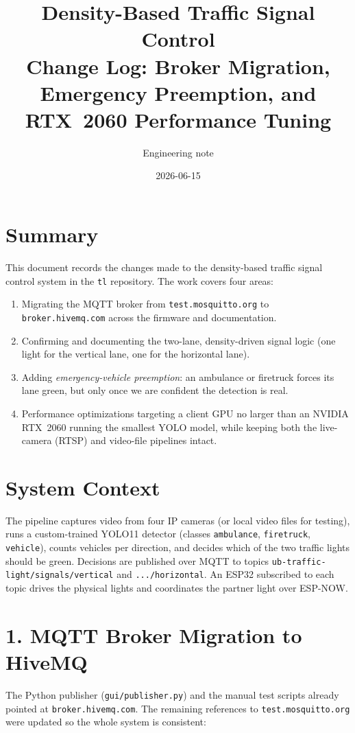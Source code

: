 \documentclass[11pt]{article}
\title{Density-Based Traffic Signal Control \\ \large Change Log: Broker Migration, Emergency Preemption, and RTX~2060 Performance Tuning}
\author{Engineering note}
\date{2026-06-15}
\begin{document}
\maketitle

\section{Summary}
This document records the changes made to the density-based traffic signal
control system in the \texttt{tl} repository. The work covers four areas:

\begin{enumerate}[nosep]
  \item Migrating the MQTT broker from \texttt{test.mosquitto.org} to
        \texttt{broker.hivemq.com} across the firmware and documentation.
  \item Confirming and documenting the two-lane, density-driven signal logic
        (one light for the vertical lane, one for the horizontal lane).
  \item Adding \emph{emergency-vehicle preemption}: an ambulance or firetruck
        forces its lane green, but only once we are confident the detection is
        real.
  \item Performance optimizations targeting a client GPU no larger than an
        NVIDIA RTX~2060 running the smallest YOLO model, while keeping both the
        live-camera (RTSP) and video-file pipelines intact.
\end{enumerate}

\section{System Context}
The pipeline captures video from four IP cameras (or local video files for
testing), runs a custom-trained YOLO11 detector
(classes \texttt{ambulance}, \texttt{firetruck}, \texttt{vehicle}), counts
vehicles per direction, and decides which of the two traffic lights should be
green. Decisions are published over MQTT to topics
\texttt{ub-traffic-light/signals/vertical} and
\texttt{.../horizontal}. An ESP32 subscribed to each topic drives the physical
lights and coordinates the partner light over ESP-NOW.

\section{1. MQTT Broker Migration to HiveMQ}
The Python publisher (\texttt{gui/publisher.py}) and the manual test scripts
already pointed at \texttt{broker.hivemq.com}. The remaining references to
\texttt{test.mosquitto.org} were updated so the whole system is consistent:
\end{document}
